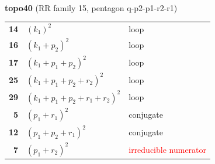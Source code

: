 \documentclass[10pt]{article}
\begin{document}
\begin{minipage}[t]{0.48\textwidth}
{}\\[2mm]\textbf{topo40} (RR family 15, pentagon q-p2-p1-r2-r1)\\[2pt]{\footnotesize\begin{tabular}{@{}r@{\ \ }l@{\ \ }l@{}}\textbf{14} & $(k_1)^2$ & loop\\
\textbf{16} & $(k_1+p_2)^2$ & loop\\
\textbf{17} & $(k_1+p_1+p_2)^2$ & loop\\
\textbf{25} & $(k_1+p_1+p_2+r_2)^2$ & loop\\
\textbf{29} & $(k_1+p_1+p_2+r_1+r_2)^2$ & loop\\
\textbf{5} & $(p_1+r_1)^2$ & conjugate\\
\textbf{12} & $(p_1+p_2+r_1)^2$ & conjugate\\
\textbf{7} & $(p_1+r_2)^2$ & \textcolor{red}{irreducible numerator}\\\end{tabular}}\end{minipage}

\bigskip
\end{document}

